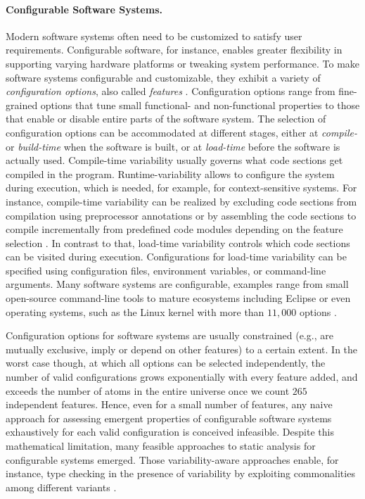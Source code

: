 \paragraph{Configurable Software Systems.}
Modern software systems often need to
be customized to satisfy user requirements. Configurable software, for instance,
enables greater flexibility in supporting varying hardware platforms or tweaking
system performance. To make software systems configurable and customizable, they
exhibit a variety of \emph{configuration options}, also called
\emph{features} \citep{apel_feature-oriented_2013}.
Configuration options range from fine-grained options that tune small
functional- and non-functional properties to those that enable or disable entire
parts of the software system. The selection of configuration options can be
accommodated at different stages, either at \emph{compile-} or \emph{build-time}
when the software is built, or at \emph{load-time} before the software is
actually used.
Compile-time variability usually governs what code sections get
compiled in the program. 
Runtime-variability allows to configure the system during execution, which is
needed, for example, for context-sensitive systems. For instance, compile-time variability can be
realized by excluding code sections from compilation using preprocessor
annotations \citep{hunsen_preprocessor-based_2016} or by assembling the code
sections to compile incrementally from predefined code modules depending on the
feature selection \citep{schaefer_delta-oriented_2010}. In contrast to that,
load-time variability controls which code sections can be visited during execution. Configurations for
load-time variability can be specified using
configuration files, environment variables, or command-line arguments.
Many software systems are configurable, examples range from small open-source
command-line tools to mature ecosystems including Eclipse or even operating
systems, such as the Linux kernel with more than $11,000$ options
\citep{dietrich_robust_2012}.

Configuration options for
software systems are usually constrained (e.g., are mutually exclusive, imply
or depend on other features) to a certain extent. In the worst case though,
at which all options can be selected independently, the number of valid
configurations grows exponentially with every feature added, and exceeds
the number of atoms in the entire universe once we count $265$ independent
features. Hence, even for a small number of features, any naive approach for
assessing emergent properties of configurable software systems exhaustively for
each valid configuration is conceived infeasible. Despite this
mathematical limitation, many feasible approaches to static analysis for
configurable systems emerged. Those variability-aware approaches enable, for
instance, type checking in the presence of variability by exploiting
commonalities among different variants \citep{thum_classification_2014}.

